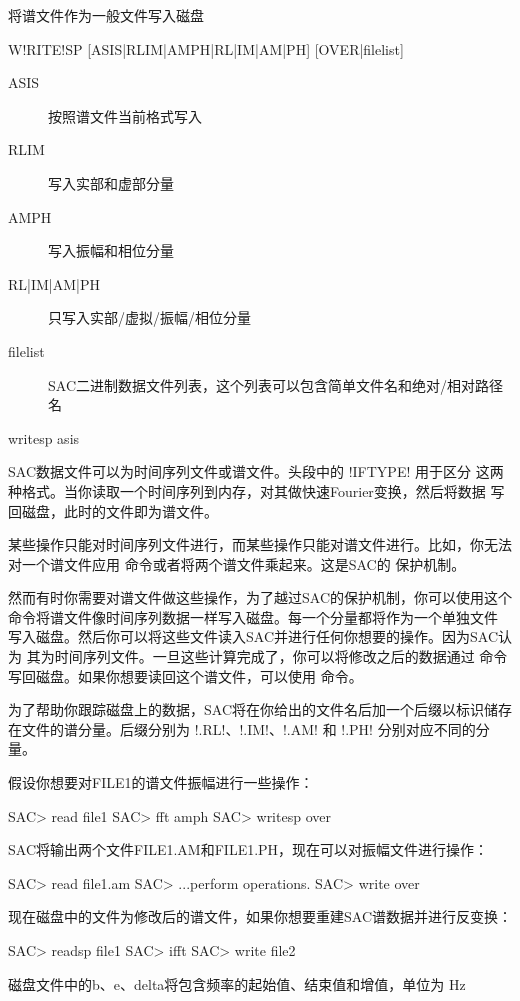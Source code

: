 \label{cmd:writesp}

将谱文件作为一般文件写入磁盘

\begin{SACSTX}
W!RITE!SP [ASIS|RLIM|AMPH|RL|IM|AM|PH] [OVER|filelist]
\end{SACSTX}

\begin{description}
\item [ASIS] 按照谱文件当前格式写入
\item [RLIM] 写入实部和虚部分量
\item [AMPH] 写入振幅和相位分量
\item [RL|IM|AM|PH] 只写入实部/虚拟/振幅/相位分量
\item [filelist]  SAC二进制数据文件列表，这个列表可以包含简单文件名和绝对/相对路径名
\end{description}

\begin{SACDFT}
writesp asis
\end{SACDFT}

SAC数据文件可以为时间序列文件或谱文件。头段中的 !IFTYPE! 用于区分
这两种格式。当你读取一个时间序列到内存，对其做快速Fourier变换，然后将数据
写回磁盘，此时的文件即为谱文件。

某些操作只能对时间序列文件进行，而某些操作只能对谱文件进行。比如，你无法
对一个谱文件应用  命令或者将两个谱文件乘起来。这是SAC的
保护机制。

然而有时你需要对谱文件做这些操作，为了越过SAC的保护机制，你可以使用这个
命令将谱文件像时间序列数据一样写入磁盘。每一个分量都将作为一个单独文件
写入磁盘。然后你可以将这些文件读入SAC并进行任何你想要的操作。因为SAC认为
其为时间序列文件。一旦这些计算完成了，你可以将修改之后的数据通过
 命令写回磁盘。如果你想要读回这个谱文件，可以使用
 命令。

为了帮助你跟踪磁盘上的数据，SAC将在你给出的文件名后加一个后缀以标识储存
在文件的谱分量。后缀分别为 !.RL!、!.IM!、!.AM! 和
!.PH! 分别对应不同的分量。

假设你想要对FILE1的谱文件振幅进行一些操作：
\begin{SACCode}
SAC> read file1
SAC> fft amph
SAC> writesp over
\end{SACCode}

SAC将输出两个文件FILE1.AM和FILE1.PH，现在可以对振幅文件进行操作：
\begin{SACCode}
SAC> read file1.am
SAC> ...perform operations.
SAC> write over
\end{SACCode}

现在磁盘中的文件为修改后的谱文件，如果你想要重建SAC谱数据并进行反变换：
\begin{SACCode}
SAC> readsp file1
SAC> ifft
SAC> write file2
\end{SACCode}

磁盘文件中的b、e、delta将包含频率的起始值、结束值和增值，单位为 \si{Hz}
